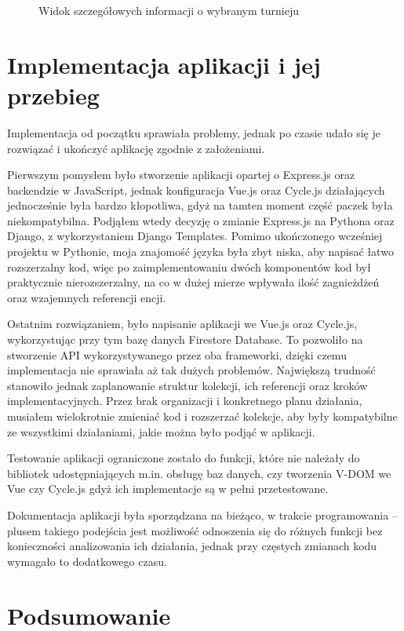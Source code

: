 \documentclass[shortabstract]{iithesis}
\theoremstyle{definition} \newtheorem{definition}{Definicja}[]
\theoremstyle{remark} \newtheorem{remark}[definition]{Observation}
\theoremstyle{plain} \newtheorem{theorem}[definition]{Theorem}
\theoremstyle{plain} \newtheorem{lemma}[definition]{Lemma}
\begin{document}
\begin{itemize}
\begin{figure}[H]
        \caption[]{Widok szczegółowych informacji o wybranym turnieju}
        \label{fig:app-tournament-details}
    \end{figure}
\end{itemize}


\chapter{Implementacja aplikacji i jej przebieg}
Implementacja od początku sprawiała problemy, jednak po czasie udało się je rozwiązać i ukończyć aplikację zgodnie z założeniami.

Pierwszym pomysłem było stworzenie aplikacji opartej o Express.js oraz backendzie w JavaScript, jednak konfiguracja Vue.js oraz Cycle.js działających jednocześnie była bardzo kłopotliwa, gdyż na tamten moment część paczek była niekompatybilna. Podjąłem wtedy decyzję o zmianie Express.js na Pythona oraz Django, z wykorzystaniem Django Templates. Pomimo ukończonego wcześniej projektu w Pythonie, moja znajomość języka była zbyt niska, aby napisać łatwo rozszerzalny kod, więc po zaimplementowaniu dwóch komponentów kod był praktycznie nierozszerzalny, na co w dużej mierze wpływała ilość zagnieżdżeń oraz wzajemnych referencji encji.

Ostatnim rozwiązaniem, było napisanie aplikacji we Vue.js oraz Cycle.js, wykorzystując przy tym bazę danych Firestore Database. To pozwoliło na stworzenie API wykorzystywanego przez oba frameworki, dzięki czemu implementacja nie sprawiała aż tak dużych problemów. Największą trudność stanowiło jednak zaplanowanie struktur kolekcji, ich referencji oraz kroków implementacyjnych. Przez brak organizacji i konkretnego planu działania, musiałem wielokrotnie zmieniać kod i rozszerzać kolekcje, aby były kompatybilne ze wszystkimi działaniami, jakie można było podjąć w aplikacji.

Testowanie aplikacji ograniczone zostało do funkcji, które nie należały do bibliotek udostępniających m.in. obsługę baz danych, czy tworzenia V-DOM we Vue czy Cycle.js gdyż ich implementacje są w pełni przetestowane.

Dokumentacja aplikacji była sporządzana na bieżąco, w trakcie programowania -- plusem takiego podejścia jest możliwość odnoszenia się do różnych funkcji bez konieczności analizowania ich działania, jednak przy częstych zmianach kodu wymagało to dodatkowego czasu.

\chapter{Podsumowanie}
\end{document}
